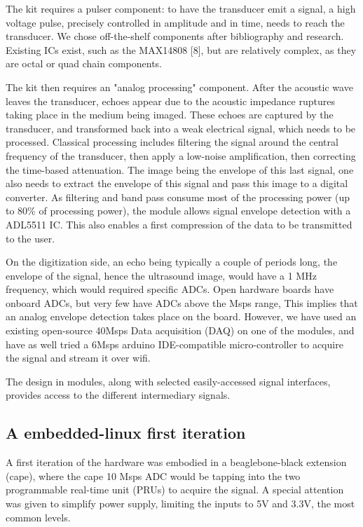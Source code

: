 \documentclass[letterpaper, 10 pt, conference]{ieeeconf} %
\begin{document}
The kit requires a pulser component: to have the transducer emit a signal, a high voltage pulse, precisely controlled in amplitude and in time, needs to reach the transducer. We chose off-the-shelf components after bibliography and research. Existing ICs exist, such as the MAX14808 [8], but are relatively complex, as they are octal or quad chain components.

The kit then requires an "analog processing" component. After the acoustic wave leaves the transducer, echoes appear due to the acoustic impedance ruptures taking place in the medium being imaged. These echoes are captured by the transducer, and transformed back into a weak electrical signal, which needs to be processed. Classical processing includes filtering the signal around the central frequency of the transducer, then apply a low-noise amplification, then correcting the time-based attenuation. The image being the envelope of this last signal, one also needs to extract the envelope of this signal and pass this image to a digital converter. As filtering and band pass consume most of the processing power (up to 80\% of processing power)\cite{c11}, the module allows signal envelope detection with a ADL5511 IC. This also enables a first compression of the data to be transmitted to the user.

On the digitization side, an echo being typically a couple of periods long, the envelope of the signal, hence the ultrasound image, would have a 1 MHz frequency, which would required specific ADCs. Open hardware boards have onboard ADCs, but very few have ADCs above the Msps range, This implies that an analog envelope detection takes place on the board. However, we have used an existing open-source 40Msps Data acquisition (DAQ) on one of the modules, and have as well tried a 6Msps arduino IDE-compatible micro-controller to acquire the signal and stream it over wifi.

The design in modules, along with selected easily-accessed signal interfaces, provides access to the different intermediary signals.


\subsection{A embedded-linux first iteration}

A first iteration of the hardware was embodied in a beaglebone-black extension (cape), where the cape 10 Msps ADC would be tapping into the two programmable real-time unit (PRUs) to acquire the signal. A special attention was given to simplify power supply, limiting the inputs to 5V and 3.3V, the most common levels.
\end{document}
